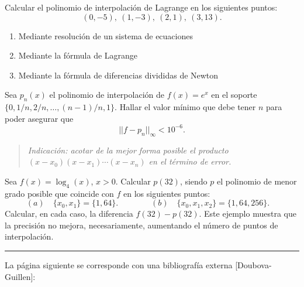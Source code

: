 \documentclass[11pt]{article}
\begin{document}
\begin{problemas}
  \begin{problema}
    Calcular el polinomio de interpolación de Lagrange en los
    siguientes puntos:
    $$
    (0,-5),\ (1,-3),\ (2,1),\ (3,13).
    $$
    \begin{enumerate}
    \item Mediante resolución de un sistema de ecuaciones
    \item Mediante la fórmula de Lagrange
    \item Mediante la fórmula de diferencias divididas de Newton
    \end{enumerate}
    
  \end{problema}
  

  

  
  \begin{problema}
    Sea $p_n(x)$ el polinomio de interpolación de $f(x)=e^x$ en el
    soporte $\{0,1/n,2/n,\dots,(n-1)/n,1\}$. Hallar el valor mínimo
    que debe tener $n$ para poder asegurar que 
    $$
    ||f-p_n||_\infty<10^{-6}.
    $$
    \begin{quotation}
      \small\em Indicación: acotar de la mejor forma posible el
      producto $(x-x_0)(x-x_1)\cdots(x-x_n)$ en el término de error.
    \end{quotation}
  \end{problema}
  
  \begin{problema}
    Sea $f(x)=\log_4(x)$, $x>0$. Calcular $p(32)$, siendo $p$ el
    polinomio de menor grado posible que coincide con $f$ en los
    siguientes puntos:
    \begin{equation*}
      (a) \quad \{x_0,x_1\}=\{1,64\}. \qquad\qquad
      (b) \quad \{x_0,x_1,x_2\}=\{1,64,256\}. 
      \quad
    \end{equation*}
    Calcular, en cada caso, la diferencia $f(32)-p(32)$. Este ejemplo
    muestra que la precisión no mejora, necesariamente, aumentando el
    número de puntos de interpolación.
  \end{problema}
  \end{problemas}
  
  \rule{0.6\linewidth}{2pt}\par
  La página siguiente se corresponde con una bibliografía externa
  [Doubova-Guillen]:
  
  
\end{document}
